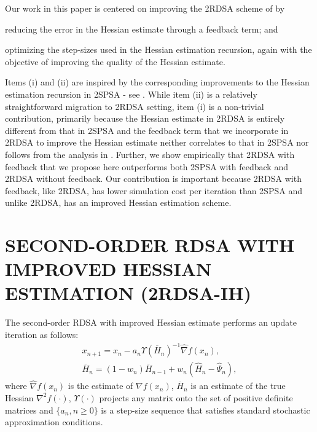 \documentclass[letterpaper, 10 pt, conference]{ieeeconf}  %
\begin{document}
Our work in this paper is centered on improving the 2RDSA scheme of \cite{prashanth2015rdsa} by \\
\begin{inparaenum}[\bfseries (i)]
\item reducing the error in the Hessian estimate through a feedback term; and\\
\item optimizing the step-sizes used in the Hessian estimation recursion, again with the objective of improving the quality of the Hessian estimate.
\end{inparaenum}

Items (i) and (ii) are inspired by the corresponding improvements to the Hessian estimation recursion in 2SPSA - see \cite{spall-jacobian}. While item (ii) is a relatively straightforward migration to 2RDSA setting, item (i) is a non-trivial contribution, primarily because the Hessian estimate in 2RDSA is entirely different from that in 2SPSA and the feedback term that we incorporate in 2RDSA to improve the Hessian estimate neither correlates to that in 2SPSA nor follows from the analysis in \cite{spall-jacobian}. Further, we show empirically that 2RDSA with feedback that we propose here outperforms both 2SPSA with feedback and 2RDSA without feedback. Our contribution is important because 2RDSA with feedback, like 2RDSA, has lower simulation cost per iteration than 2SPSA and unlike 2RDSA, has an improved Hessian estimation scheme.

\section{SECOND-ORDER RDSA WITH IMPROVED HESSIAN ESTIMATION (2RDSA-IH)}
The second-order RDSA with improved Hessian estimate performs an update iteration as follows:
\begin{align}
\label{eq:e2rdsa}
x_{n+1} = x_n - a_n \Upsilon(\overline H_n)^{-1}\widehat\nabla f(x_n), \\
\overline H_n = (1-w_{n})  \overline H_{n-1} + w_{n} ( \widehat H_n - \widehat \Psi_n),\label{eq:2rdsa-H}
\end{align}
where $\widehat\nabla f(x_n)$ is the estimate of $\nabla f(x_n)$, 
$\overline H_n$ is an estimate of the true Hessian ${\nabla}^2 f(\cdot)$, $\Upsilon(\cdot)$ projects any matrix onto the set of positive definite matrices and $\{a_n, n\ge 0\}$ is a step-size sequence that satisfies standard stochastic approximation conditions.  
\end{document}
